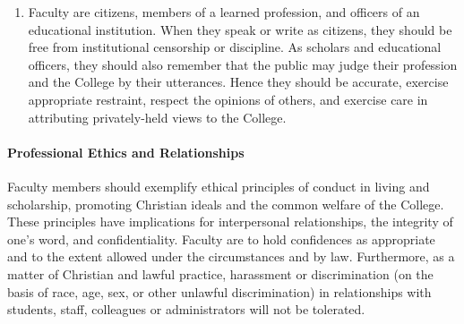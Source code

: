 \begin{enumerate}[label=\alph*)]
{\begin{enumerate}[label=\arabic*)]
							\item{Faculty are citizens, members of a learned profession, and officers of an educational institution.  When they speak or write as citizens, they should be free from institutional censorship or discipline.  As scholars and educational officers, they should also remember that the public may judge their profession and the College by their utterances.  Hence they should be accurate, exercise appropriate restraint, respect the opinions of others, and exercise care in attributing privately-held views to the College.}
						\end{enumerate}
					}
				\end{enumerate}
			\paragraph{Professional Ethics and Relationships}
				Faculty members should exemplify ethical principles of conduct in living and scholarship, promoting Christian ideals and the common welfare of the College.  These principles have implications for interpersonal relationships, the integrity of one's word, and confidentiality.  Faculty are to hold confidences as appropriate and to the extent allowed under the circumstances and by law.  Furthermore, as a matter of Christian and lawful practice, harassment or discrimination (on the basis of race, age, sex, or other unlawful discrimination) in relationships with students, staff, colleagues or administrators will not be tolerated.
